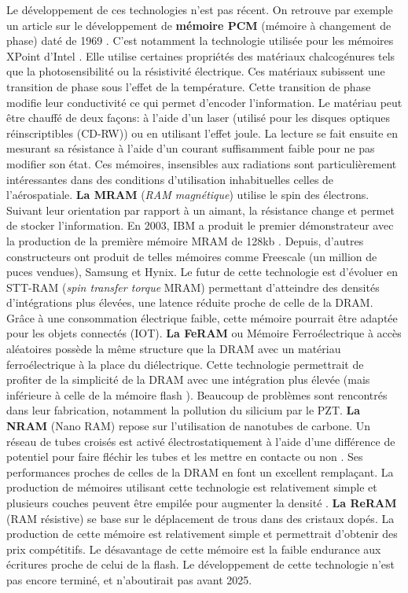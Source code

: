         Le développement de ces technologies n'est pas récent. On retrouve par exemple un article sur le développement de \textbf{mémoire PCM} (mémoire à changement de phase) daté de 1969 \cite{Sie1969}. C'est notamment la technologie utilisée pour les mémoires XPoint d'Intel \cite{Handy2015}. Elle utilise certaines propriétés des matériaux chalcogénures tels que la photosensibilité ou la résistivité électrique. Ces matériaux subissent une transition de phase sous l'effet de la température. Cette transition de phase modifie leur conductivité ce qui permet d'encoder l'information. Le matériau peut être chauffé de deux façons: à l'aide d'un laser (utilisé pour les disques optiques réinscriptibles (CD-RW)) ou en utilisant l'effet joule. La lecture se fait ensuite en mesurant sa résistance à l'aide d'un courant suffisamment faible pour ne pas modifier son état. Ces mémoires, insensibles aux radiations sont particulièrement intéressantes dans des conditions d'utilisation inhabituelles celles de l'aérospatiale. \textbf{La MRAM} (\textit{RAM magnétique}) utilise le spin des électrons.  Suivant leur orientation par rapport à un aimant, la résistance change et permet de stocker l'information. En 2003, IBM a produit le premier démonstrateur avec la production de la première mémoire MRAM de 128kb  \cite{Bette2003}. Depuis, d'autres constructeurs ont produit de telles mémoires comme Freescale (un million de puces vendues), Samsung et Hynix. Le futur de cette technologie est d'évoluer en STT-RAM \cite{Alvarez-Herault2010} (\textit{spin transfer torque} MRAM) permettant d'atteindre des densités d'intégrations plus élevées, une latence réduite proche de celle de la DRAM. Grâce à une consommation électrique faible, cette mémoire pourrait être adaptée pour les objets connectés (IOT). \textbf{La FeRAM} ou Mémoire Ferroélectrique à accès aléatoires possède la même structure que la DRAM avec un matériau ferroélectrique à la place du diélectrique. Cette technologie permettrait de profiter de la simplicité de la DRAM avec une intégration plus élevée (mais inférieure à celle de la mémoire flash \cite{Alvarez-Herault2010}). Beaucoup de problèmes sont rencontrés dans leur fabrication, notamment la pollution du silicium par le PZT. \textbf{La NRAM} (Nano RAM) repose sur l'utilisation de nanotubes de carbone. Un réseau de tubes croisés est activé électrostatiquement à l'aide d'une différence de potentiel pour faire fléchir les tubes et les mettre en contacte ou non \cite{Ricart2008}. Ses performances proches de celles de la DRAM en font un excellent remplaçant. La production de mémoires utilisant cette technologie est relativement simple et plusieurs couches peuvent être empilée pour augmenter la densité \cite{Gervasi2019}. \textbf{La ReRAM} (RAM résistive) se base sur le déplacement de trous dans des cristaux dopés. La production de cette mémoire est relativement simple et permettrait d'obtenir des prix compétitifs. Le désavantage de cette mémoire est la faible endurance aux écritures proche de celui de la flash. Le développement de cette technologie n'est pas encore terminé, et n'aboutirait pas avant 2025.
        
